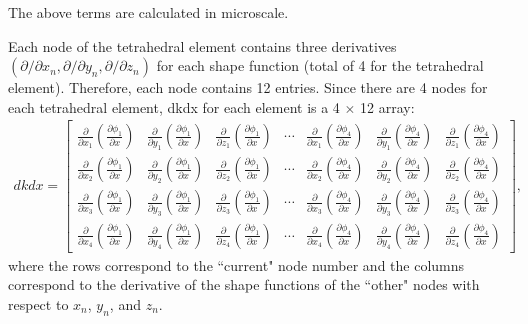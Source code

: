 %
The above terms are calculated in microscale. %

Each node of the tetrahedral element contains three derivatives $(\partial/\partial x_n, \partial/\partial y_n, \partial/\partial z_n)$ for each shape function (total of 4 for the tetrahedral element). Therefore, each node contains 12 entries. Since there are 4 nodes for each tetrahedral element, dkdx for each element is a 4 $\times$ 12 array:
%
\begin{eqnarray}
dkdx = 
%
\begin{bmatrix}
\frac{\partial}{\partial x_1}\left(\frac{\partial \phi_1}{\partial x}\right) & \frac{\partial}{\partial y_1}\left(\frac{\partial \phi_1}{\partial x}\right) & \frac{\partial}{\partial z_1}\left(\frac{\partial \phi_1}{\partial x}\right) & \cdots &\frac{\partial}{\partial x_1}\left(\frac{\partial \phi_4}{\partial x}\right) & \frac{\partial}{\partial y_1}\left(\frac{\partial \phi_4}{\partial x}\right) & \frac{\partial}{\partial z_1}\left(\frac{\partial \phi_4}{\partial x}\right) \\
\frac{\partial}{\partial x_2}\left(\frac{\partial \phi_1}{\partial x}\right) & \frac{\partial}{\partial y_2}\left(\frac{\partial \phi_1}{\partial x}\right) & \frac{\partial}{\partial z_2}\left(\frac{\partial \phi_1}{\partial x}\right) & \cdots &\frac{\partial}{\partial x_2}\left(\frac{\partial \phi_4}{\partial x}\right) & \frac{\partial}{\partial y_2}\left(\frac{\partial \phi_4}{\partial x}\right) & \frac{\partial}{\partial z_2}\left(\frac{\partial \phi_4}{\partial x}\right) \\
\frac{\partial}{\partial x_3}\left(\frac{\partial \phi_1}{\partial x}\right) & \frac{\partial}{\partial y_3}\left(\frac{\partial \phi_1}{\partial x}\right) & \frac{\partial}{\partial z_3}\left(\frac{\partial \phi_1}{\partial x}\right) & \cdots &\frac{\partial}{\partial x_3}\left(\frac{\partial \phi_4}{\partial x}\right) & \frac{\partial}{\partial y_3}\left(\frac{\partial \phi_4}{\partial x}\right) & \frac{\partial}{\partial z_3}\left(\frac{\partial \phi_4}{\partial x}\right) \\
\frac{\partial}{\partial x_4}\left(\frac{\partial \phi_1}{\partial x}\right) & \frac{\partial}{\partial y_4}\left(\frac{\partial \phi_1}{\partial x}\right) & \frac{\partial}{\partial z_4}\left(\frac{\partial \phi_1}{\partial x}\right) & \cdots & \frac{\partial}{\partial x_4}\left(\frac{\partial \phi_4}{\partial x}\right) & \frac{\partial}{\partial y_4}\left(\frac{\partial \phi_4}{\partial x}\right) & \frac{\partial}{\partial z_4}\left(\frac{\partial \phi_4}{\partial x}\right)
\end{bmatrix},
\end{eqnarray}
%
where the rows correspond to the ``current" node number and the columns correspond to the derivative of the shape functions of the ``other" nodes with respect to $x_n$, $y_n$, and $z_n$.

